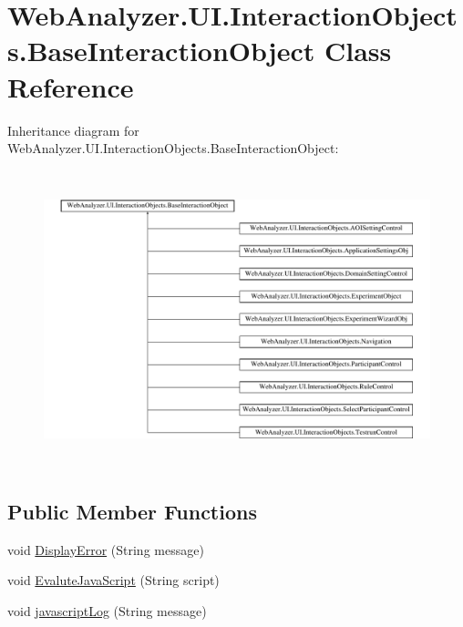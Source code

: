 \hypertarget{class_web_analyzer_1_1_u_i_1_1_interaction_objects_1_1_base_interaction_object}{}\section{Web\+Analyzer.\+U\+I.\+Interaction\+Objects.\+Base\+Interaction\+Object Class Reference}
\label{class_web_analyzer_1_1_u_i_1_1_interaction_objects_1_1_base_interaction_object}
Inheritance diagram for Web\+Analyzer.\+U\+I.\+Interaction\+Objects.\+Base\+Interaction\+Object\+:\begin{figure}[H]
\begin{center}
\leavevmode
\includegraphics[height=8.627451cm]{class_web_analyzer_1_1_u_i_1_1_interaction_objects_1_1_base_interaction_object}
\end{center}
\end{figure}
\subsection*{Public Member Functions}
\begin{DoxyCompactItemize}
\item 
void \hyperlink{class_web_analyzer_1_1_u_i_1_1_interaction_objects_1_1_base_interaction_object_ab7fc25e42888acfba791389cbba16069}{Display\+Error} (String message)
\item 
void \hyperlink{class_web_analyzer_1_1_u_i_1_1_interaction_objects_1_1_base_interaction_object_af86a8726164ce830fa14f49160bb3f05}{Evalute\+Java\+Script} (String script)
\item 
void \hyperlink{class_web_analyzer_1_1_u_i_1_1_interaction_objects_1_1_base_interaction_object_acec4cefdd4842652a61bc0cb62746a0d}{javascript\+Log} (String message)
\end{DoxyCompactItemize}
